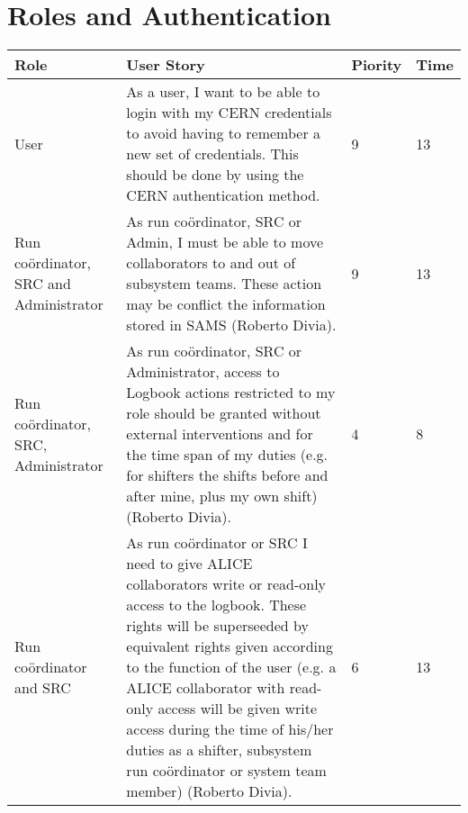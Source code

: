 \section{Roles and Authentication}
\begin{longtable}{ | p{2cm} | p{8cm} | p{1.5cm} | l |}
\hline
Role & User Story & Piority & Time \\ \hline
User & As a user, I want to be able to login with my CERN credentials to avoid having to remember a new set of credentials. This should be done by using the CERN authentication method. & 9 & 13 \\ \hline
Run coördinator, SRC and Administrator &  As run coördinator, SRC or Admin, I must be able to move collaborators to and out of subsystem teams. These action may be conflict the information stored in SAMS (Roberto Divia). & 9 & 13 \\ \hline
Run coördinator, SRC, Administrator & As run coördinator, SRC or Administrator, access to Logbook actions restricted to my role should be granted without external interventions and for the time span of my duties (e.g. for shifters the shifts before and after mine, plus my own shift) (Roberto Divia). &4 & 8\\ \hline
Run coördinator and SRC &  As run coördinator or SRC I need to give ALICE collaborators write or read-only access to the logbook. These rights will be superseeded by equivalent rights given according to the function of the user (e.g. a ALICE collaborator with read-only access will be given write access during the time of his/her duties as a shifter, subsystem run coördinator or system team member) (Roberto Divia).&6&13 \\ \hline
\end{longtable}
\newpage
